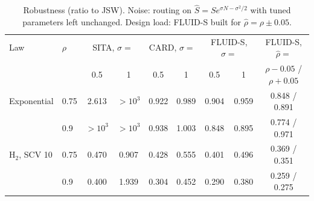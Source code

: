 \begin{table}[t]
\centering\footnotesize
\caption{Robustness (ratio to JSW). Noise: routing on $\hat S=Se^{\sigma N-\sigma^2/2}$ with tuned parameters left unchanged. Design load: FLUID-S built for $\hat\rho=\rho\pm0.05$.}\label{tab:robust}
\begin{tabular}{@{}llccccccc@{}}
\toprule
Law & $\rho$ & \multicolumn{2}{c}{SITA, $\sigma=$} & \multicolumn{2}{c}{CARD, $\sigma=$} & \multicolumn{2}{c}{FLUID-S, $\sigma=$} & FLUID-S, $\hat\rho=$\\
& & 0.5 & 1 & 0.5 & 1 & 0.5 & 1 & $\rho-0.05$ / $\rho+0.05$\\
\midrule
Exponential & 0.75 & 2.613 & $>10^3$ & 0.922 & 0.989 & 0.904 & 0.959 & 0.848 / 0.891\\
 & 0.9 & $>10^3$ & $>10^3$ & 0.938 & 1.003 & 0.848 & 0.895 & 0.774 / 0.971\\
H$_2$, SCV 10 & 0.75 & 0.470 & 0.907 & 0.428 & 0.555 & 0.401 & 0.496 & 0.369 / 0.351\\
 & 0.9 & 0.400 & 1.939 & 0.304 & 0.452 & 0.290 & 0.380 & 0.259 / 0.275\\
\bottomrule
\end{tabular}
\end{table}
